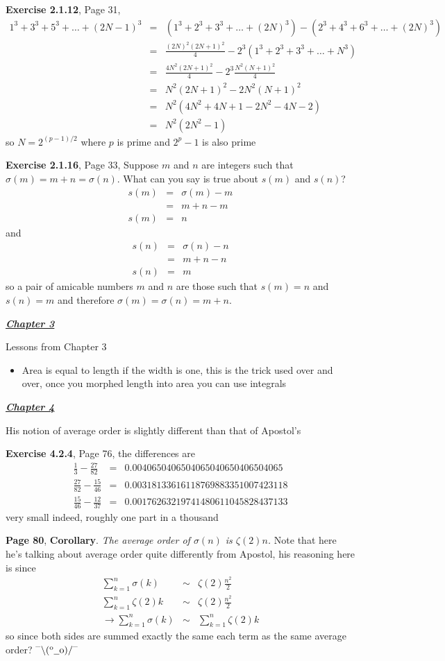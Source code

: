 \documentclass[aps,preprint,preprintnumbers,nofootinbib,showpacs,prd]{revtex4-1}
\newcommand{\bit}{\begin{itemize}}
\newcommand{\eit}{\end{itemize}}
\newcommand{\nbea}{\begin{eqnarray*}}
\newcommand{\neea}{\end{eqnarray*}}
\newcommand{\dunno}{$ {}^{\mbox {--}}\backslash(^{\rm o}{}\underline{\hspace{0.2cm}}{\rm o})/^{\mbox {--}}$}
\begin{document}
{\bf Exercise 2.1.12}, Page 31,
%
\nbea
1^3 + 3^3 + 5^3 + \ldots + (2N-1)^3 & = & \left(1^3 + 2^3 + 3^3 + \ldots + (2N)^3\right) - \left(2^3+4^3+6^3 + \ldots+(2N)^3\right) \\
& = & \frac{(2N)^2(2N+1)^2}{4} - 2^3\left(1^3 + 2^3 + 3^3 + \ldots+N^3\right) \\
& = & \frac{4N^2(2N+1)^2}{4} - 2^3 \frac{N^2(N+1)^2}{4} \\
& = & N^2(2N+1)^2 - 2N^2(N+1)^2 \\
& = & N^2 \left( 4N^2 + 4N + 1 - 2N^2 - 4N - 2\right) \\
& = & N^2(2N^2-1)
\neea
%
so $N=2^{(p-1)/2}$ where $p$ is prime and $2^p-1$ is also prime

{\bf Exercise 2.1.16}, Page 33, Suppose $m$ and $n$ are integers such that $\sigma(m) = m + n = \sigma(n)$. What can you say is true about $s(m)$ and $s(n)$?
%
\nbea
s(m) & = & \sigma(m) - m \\
& = & m+n-m \\
s(m)& = & n
\neea
%
and
%
\nbea
s(n) & = & \sigma(n) - n\\
& = & m+n-n \\
s(n)& = & m
\neea
%
so a pair of amicable numbers $m$ and $n$ are those such that $s(m)=n$ and $s(n) = m$ and therefore $\sigma(m)=\sigma(n) = m+n$.

\bigskip
\underline{\textbf{\textit{Chapter 3}}}
\bigskip

Lessons from Chapter 3
%
\bit
\item Area is equal to length if the width is one, this is the trick used over and over, once you morphed length into area you can use integrals
\eit

\bigskip
\underline{\textbf{\textit{Chapter 4}}}
\bigskip

His notion of average order is slightly different than that of Apostol's

{\bf Exercise 4.2.4}, Page 76, the differences are
%
\nbea
\frac{1}{3} - \frac{27}{82} & = & 0.0040650406504065040650406504065 \\
\frac{27}{82} - \frac{15}{46} & = & 0.00318133616118769883351007423118 \\
\frac{15}{46} - \frac{12}{37} & = & 0.00176263219741480611045828437133
\neea
%
very small indeed, roughly one part in a thousand

{\bf Page 80}, {\bf Corollary}. {\it The average order of $\sigma(n)$ is $\zeta(2)n$.} Note that here he's talking about average order quite differently from Apostol, his reasoning here is since
%
\nbea
\sum_{k=1}^n \sigma(k) &\sim& \zeta(2)\frac{n^2}{2} \\
\sum_{k=1}^n \zeta(2) k &\sim& \zeta(2)\frac{n^2}{2} \\
\to \sum_{k=1}^n \sigma(k) &\sim& \sum_{k=1}^n \zeta(2) k
\neea
%
so since both sides are summed exactly the same each term as the same average order? \dunno
\end{document}
